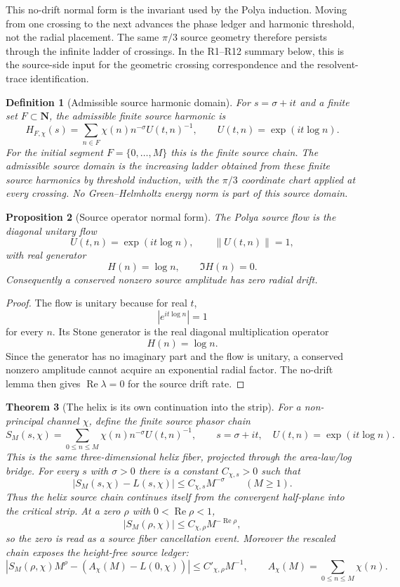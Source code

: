 \documentclass[11pt]{article}
\newtheorem{definition}{Definition}[section]
\newtheorem{theorem}[definition]{Theorem}
\newtheorem{proposition}[definition]{Proposition}
\DeclareMathOperator{\Ree}{Re}
\begin{document}
This no-drift normal form is the invariant used by the Polya induction.  Moving
from one crossing to the next advances the phase ledger and harmonic threshold,
not the radial placement.  The same $\pi/3$ source geometry therefore persists
through the infinite ladder of crossings.  In the R1--R12 summary below, this
is the source-side input for the geometric crossing correspondence and the
resolvent-trace identification.

\begin{definition}[Admissible source harmonic domain]
For $s=\sigma+it$ and a finite set $F\subset\mathbf N$, the admissible finite
source harmonic is
\[
  H_{F,\chi}(s)
  =
  \sum_{n\in F}\chi(n)n^{-\sigma}U(t,n)^{-1},
  \qquad
  U(t,n)=\exp(it\log n).
\]
For the initial segment $F=\{0,\ldots,M\}$ this is the finite source chain.
The admissible source domain is the increasing ladder obtained from these
finite source harmonics by threshold induction, with the $\pi/3$ coordinate
chart applied at every crossing.  No Green--Helmholtz energy norm is part of
this source domain.
\end{definition}

\begin{proposition}[Source operator normal form]
The Polya source flow is the diagonal unitary flow
\[
  U(t,n)=\exp(it\log n),
  \qquad
  \|U(t,n)\|=1,
\]
with real generator
\[
  H(n)=\log n,\qquad \Im H(n)=0.
\]
Consequently a conserved nonzero source amplitude has zero radial drift.
\end{proposition}

\begin{proof}
The flow is unitary because for real $t$,
\[
  |e^{it\log n}|=1
\]
for every $n$.  Its Stone generator is the real diagonal multiplication
operator
\[
  H(n)=\log n.
\]
Since the generator has no imaginary part and the flow is unitary, a conserved
nonzero amplitude cannot acquire an exponential radial factor.  The no-drift
lemma then gives $\Ree\lambda=0$ for the source drift rate.
\end{proof}

\begin{theorem}[The helix is its own continuation into the strip]
For a non-principal channel $\chi$, define the finite source phasor chain
\[
  S_M(s,\chi)
  =
  \sum_{0\le n\le M}
    \chi(n)n^{-\sigma}U(t,n)^{-1},
  \qquad
  s=\sigma+it,\quad U(t,n)=\exp(it\log n).
\]
This is the same three-dimensional helix fiber, projected through the
area-law/log bridge.  For every $s$ with $\sigma>0$ there is a constant
$C_{\chi,s}>0$ such that
\[
  \left|S_M(s,\chi)-L(s,\chi)\right|
  \le
  C_{\chi,s}M^{-\sigma}
  \qquad(M\ge1).
\]
Thus the helix source chain continues itself from the convergent half-plane
into the critical strip.  At a zero $\rho$ with $0<\Ree\rho<1$,
\[
  |S_M(\rho,\chi)|
  \le
  C_{\chi,\rho}M^{-\Ree\rho},
\]
so the zero is read as a source fiber cancellation event.  Moreover the
rescaled chain exposes the height-free source ledger:
\[
  \left|
    S_M(\rho,\chi)M^\rho
    -
    \left(A_\chi(M)-L(0,\chi)\right)
  \right|
  \le
  C'_{\chi,\rho}M^{-1},
  \qquad
  A_\chi(M)=\sum_{0\le n\le M}\chi(n).
\]
\end{theorem}
\end{document}
